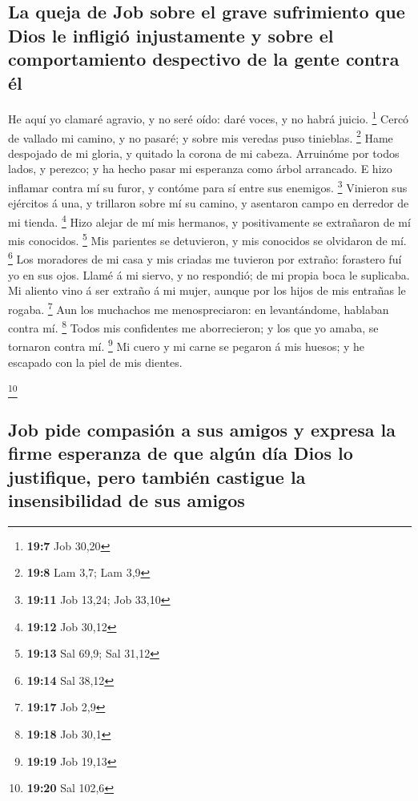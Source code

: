 \hypertarget{la-queja-de-job-sobre-el-grave-sufrimiento-que-dios-le-infligiuxf3-injustamente-y-sobre-el-comportamiento-despectivo-de-la-gente-contra-uxe9l}{%
\subsection{La queja de Job sobre el grave sufrimiento que Dios le
infligió injustamente y sobre el comportamiento despectivo de la gente
contra
él}\label{la-queja-de-job-sobre-el-grave-sufrimiento-que-dios-le-infligiuxf3-injustamente-y-sobre-el-comportamiento-despectivo-de-la-gente-contra-uxe9l}}

 He aquí yo clamaré agravio, y no seré oído: daré voces, y
no habrá juicio. \footnote{\textbf{19:7} Job 30,20}  Cercó
de vallado mi camino, y no pasaré; y sobre mis veredas puso tinieblas.
\footnote{\textbf{19:8} Lam 3,7; Lam 3,9}  Hame despojado de
mi gloria, y quitado la corona de mi cabeza.  Arruinóme por
todos lados, y perezco; y ha hecho pasar mi esperanza como árbol
arrancado.  E hizo inflamar contra mí su furor, y contóme
para sí entre sus enemigos. \footnote{\textbf{19:11} Job 13,24; Job
  33,10}  Vinieron sus ejércitos á una, y trillaron sobre
mí su camino, y asentaron campo en derredor de mi tienda. \footnote{\textbf{19:12}
  Job 30,12}  Hizo alejar de mí mis hermanos, y
positivamente se extrañaron de mí mis conocidos. \footnote{\textbf{19:13}
  Sal 69,9; Sal 31,12}  Mis parientes se detuvieron, y mis
conocidos se olvidaron de mí. \footnote{\textbf{19:14} Sal 38,12}
 Los moradores de mi casa y mis criadas me tuvieron por
extraño: forastero fuí yo en sus ojos.  Llamé á mi siervo,
y no respondió; de mi propia boca le suplicaba.  Mi aliento
vino á ser extraño á mi mujer, aunque por los hijos de mis entrañas le
rogaba. \footnote{\textbf{19:17} Job 2,9}  Aun los
muchachos me menospreciaron: en levantándome, hablaban contra mí.
\footnote{\textbf{19:18} Job 30,1}  Todos mis confidentes
me aborrecieron; y los que yo amaba, se tornaron contra mí. \footnote{\textbf{19:19}
  Job 19,13}  Mi cuero y mi carne se pegaron á mis huesos;
y he escapado con la piel de mis dientes.

\footnote{\textbf{19:20} Sal 102,6}

\hypertarget{job-pide-compasiuxf3n-a-sus-amigos-y-expresa-la-firme-esperanza-de-que-alguxfan-duxeda-dios-lo-justifique-pero-tambiuxe9n-castigue-la-insensibilidad-de-sus-amigos}{%
\subsection{Job pide compasión a sus amigos y expresa la firme esperanza
de que algún día Dios lo justifique, pero también castigue la
insensibilidad de sus
amigos}\label{job-pide-compasiuxf3n-a-sus-amigos-y-expresa-la-firme-esperanza-de-que-alguxfan-duxeda-dios-lo-justifique-pero-tambiuxe9n-castigue-la-insensibilidad-de-sus-amigos}}

